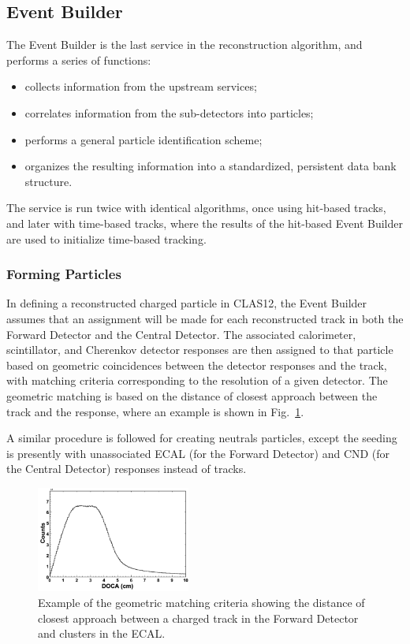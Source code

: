 \subsection{Event Builder}
\label{sec:eb}

The Event Builder is the last service in the reconstruction algorithm, and performs a series of functions:

\begin{itemize}
    \item collects information from the upstream services;
    \item correlates information from the sub-detectors into particles;
    \item performs a general particle identification scheme;
    \item organizes the resulting information into a standardized, persistent data bank structure.
\end{itemize}

The service is run twice with identical algorithms, once using hit-based tracks, and later with time-based tracks,
where the results of the hit-based Event Builder are used to initialize time-based tracking.

\subsubsection{Forming Particles}

In defining a reconstructed charged particle in CLAS12, the Event Builder assumes that an assignment will be
made for each reconstructed track in both the Forward Detector and the Central Detector. The associated
calorimeter, scintillator, and Cherenkov detector responses are then assigned to that particle based on
geometric coincidences between the detector responses and the track, with matching criteria corresponding
to the resolution of a given detector. The geometric matching is based on the distance of closest approach
between the track and the response, where an example is shown in Fig.~\ref{fig:ebmatch}.

A similar procedure is followed for creating neutrals particles, except the seeding is presently with
unassociated ECAL (for the Forward Detector) and CND (for the Central Detector) responses instead of tracks.

\begin{figure}
\centering
\includegraphics[width=0.45\textwidth,height=0.2\textheight]{pics/pcal-doca.png}
\caption{Example of the geometric matching criteria showing the distance of closest approach between a charged
  track in the Forward Detector and clusters in the ECAL.}
  \label{fig:ebmatch}
\end{figure}

